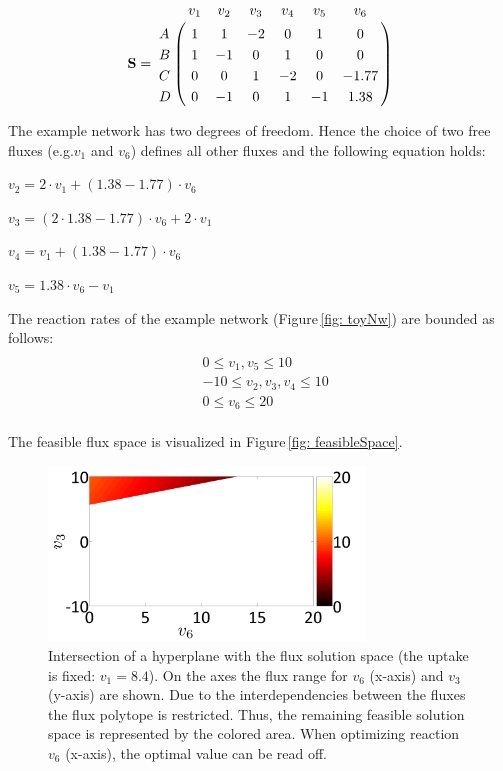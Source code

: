 \begin{align}\label{eq:stoichMatrixNw}
\mat{S} = \bordermatrix{~ & v_1 & v_2  & v_3  & v_4  & v_5  & v_6 \cr
A& 1 & 1 & -2 & 0 & 1 & 0 \cr
B& 1 & -1 & 0 & 1 & 0 & 0 \cr
C& 0 & 0 & 1 & -2 & 0 & -1.77 \cr
D& 0 & -1 & 0 & 1 & -1 & 1.38 \cr}
\end{align}

The example network  has two degrees of freedom. Hence the choice of two free fluxes (e.g.\@ $v_1$ and $v_6$) defines all other fluxes and the following equation holds: 

$v_2 = 2 \cdot v_1 + (1.38 - 1.77) \cdot v_6$

$v_3 = (2 \cdot 1.38 - 1.77) \cdot v_6 + 2\cdot v_1$

$v_4 = v_1 + (1.38 - 1.77) \cdot v_6$

$v_5 = 1.38 \cdot v_6 - v_1$

 The reaction rates of the example network (Figure\,\ref{fig: toyNw}) are bounded as follows:
\begin{align}\label{eq:fluxBoundsNw}
	\begin{array}{rl}
& \begin{matrix}
 0  \le v_1,v_5  \le 10 \\
 -10 \le v_2,v_3,v_4 \le 10 \\
0  \le v_6  \le 20
\end{matrix} 
	\end{array}
\end{align}

The feasible flux space is visualized in Figure\,\ref{fig: feasibleSpace}. 

\begin{figure}[htb]
\centering
\includegraphics[width=0.75\textwidth]{SolutionSpaceToyNw.png}
\caption{Intersection of a hyperplane with the flux solution space (the uptake is fixed: $v_1=8.4$). On the axes the flux range for $v_6$ (x-axis) and $v_3$ (y-axis) are shown. Due to the interdependencies between the fluxes the flux polytope is restricted. Thus, the remaining feasible solution space is represented by the colored area. When optimizing reaction $v_6$ (x-axis), the optimal value can be read off.}
\end{figure}


